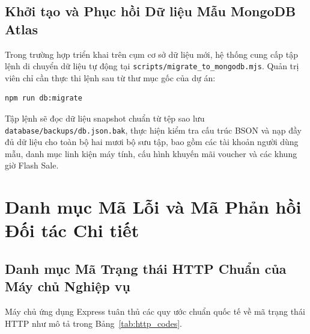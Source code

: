 \documentclass[12pt,a4paper]{report}
\begin{document}
\section{Khởi tạo và Phục hồi Dữ liệu Mẫu MongoDB Atlas}
Trong trường hợp triển khai trên cụm cơ sở dữ liệu mới, hệ thống cung cấp tập lệnh di chuyển dữ liệu tự động tại \texttt{scripts/migrate\_to\_mongodb.mjs}. Quản trị viên chỉ cần thực thi lệnh sau từ thư mục gốc của dự án:
\begin{verbatim}
npm run db:migrate
\end{verbatim}

Tập lệnh sẽ đọc dữ liệu snapshot chuẩn từ tệp sao lưu \texttt{database/backups/db.json.bak}, thực hiện kiểm tra cấu trúc BSON và nạp đầy đủ dữ liệu cho toàn bộ hai mươi bộ sưu tập, bao gồm các tài khoản người dùng mẫu, danh mục linh kiện máy tính, cấu hình khuyến mãi voucher và các khung giờ Flash Sale.

\chapter{Danh mục Mã Lỗi và Mã Phản hồi Đối tác Chi tiết}

\section{Danh mục Mã Trạng thái HTTP Chuẩn của Máy chủ Nghiệp vụ}
Máy chủ ứng dụng Express tuân thủ các quy ước chuẩn quốc tế về mã trạng thái HTTP như mô tả trong Bảng~\ref{tab:http_codes}.
\end{document}
